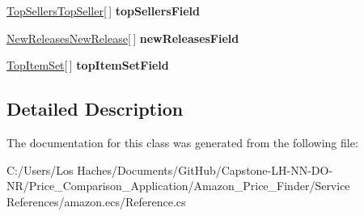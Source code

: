 \begin{DoxyCompactItemize}
\item 
\hypertarget{class_price___comparison_1_1amazon_1_1ecs_1_1_browse_node_a1c9189278b5773e09b67bf43a3d47f10}{\hyperlink{class_price___comparison_1_1amazon_1_1ecs_1_1_top_sellers_top_seller}{Top\-Sellers\-Top\-Seller}\mbox{[}$\,$\mbox{]} {\bfseries top\-Sellers\-Field}}\label{class_price___comparison_1_1amazon_1_1ecs_1_1_browse_node_a1c9189278b5773e09b67bf43a3d47f10}

\item 
\hypertarget{class_price___comparison_1_1amazon_1_1ecs_1_1_browse_node_ae7d2b05e34383e3ad08652fb6581ab44}{\hyperlink{class_price___comparison_1_1amazon_1_1ecs_1_1_new_releases_new_release}{New\-Releases\-New\-Release}\mbox{[}$\,$\mbox{]} {\bfseries new\-Releases\-Field}}\label{class_price___comparison_1_1amazon_1_1ecs_1_1_browse_node_ae7d2b05e34383e3ad08652fb6581ab44}

\item 
\hypertarget{class_price___comparison_1_1amazon_1_1ecs_1_1_browse_node_a730ef49c4f2e89628b01fa80353a20a4}{\hyperlink{class_price___comparison_1_1amazon_1_1ecs_1_1_top_item_set}{Top\-Item\-Set}\mbox{[}$\,$\mbox{]} {\bfseries top\-Item\-Set\-Field}}\label{class_price___comparison_1_1amazon_1_1ecs_1_1_browse_node_a730ef49c4f2e89628b01fa80353a20a4}

\end{DoxyCompactItemize}


\subsection{Detailed Description}


The documentation for this class was generated from the following file\-:\begin{DoxyCompactItemize}
\item 
C\-:/\-Users/\-Los Haches/\-Documents/\-Git\-Hub/\-Capstone-\/\-L\-H-\/\-N\-N-\/\-D\-O-\/\-N\-R/\-Price\-\_\-\-Comparison\-\_\-\-Application/\-Amazon\-\_\-\-Price\-\_\-\-Finder/\-Service References/amazon.\-ecs/Reference.\-cs\end{DoxyCompactItemize}
